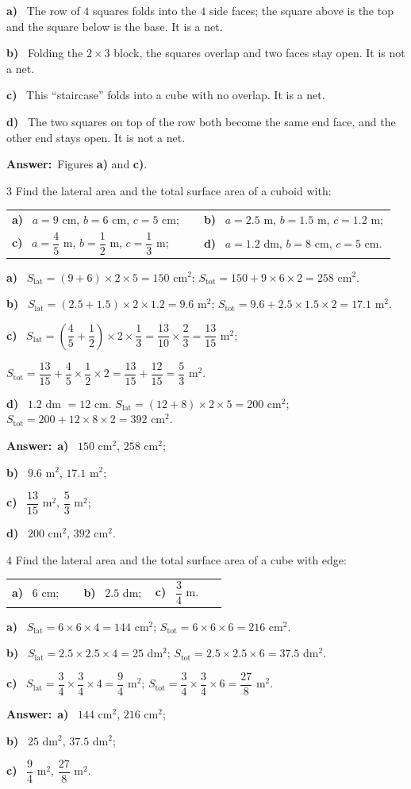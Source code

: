 \documentclass[11pt]{article}
\makeatletter
\newif\ifsol \solfalse
\renewcommand{\arraystretch}{1.35}
\providecommand{\AnsWord}{Đáp số}
\newcommand{\dapso}[1]{\par\textbf{\AnsWord:}\ #1}
\newcommand{\probsol}[1]{%
  \begin{lrbox}{\solmeasure}\begin{minipage}{\dimexpr\linewidth-24pt\relax}#1\end{minipage}\end{lrbox}%
  \ifsol
    \begin{solbox}#1\end{solbox}%
  \else
    \setlength{\solht}{\dimexpr\ht\solmeasure+\dp\solmeasure+0.85cm\relax}%
    \ifdim\solht<1.35cm\setlength{\solht}{1.35cm}\fi
    \begin{tcolorbox}[colback=white,colframe=Line,boxrule=0.8pt,arc=5pt,
      left=8pt,right=8pt,top=4pt,bottom=4pt,height=\solht]{\footnotesize\color{Slate}\itshape\WorkWord}\end{tcolorbox}%
  \fi}
\newcommand{\pa}[1]{\textbf{#1)}\ }
\newenvironment{cols2}{\par\vspace{3pt}\noindent\setlength{\tabcolsep}{0pt}\renewcommand{\arraystretch}{1.3}%
  \begin{tabular}{@{}>{\raggedright\arraybackslash\rule{0pt}{4.4ex}}p{0.48\linewidth}<{\rule[-2.3ex]{0pt}{0pt}}@{\hspace{0.03\linewidth}}>{\raggedright\arraybackslash\rule{0pt}{4.4ex}}p{0.48\linewidth}<{\rule[-2.3ex]{0pt}{0pt}}@{}}}%
  {\end{tabular}\par}
\newenvironment{cols3}{\par\vspace{3pt}\noindent\setlength{\tabcolsep}{0pt}\renewcommand{\arraystretch}{1.3}%
  \begin{tabular}{@{}>{\raggedright\arraybackslash\rule{0pt}{4.4ex}}p{0.32\linewidth}<{\rule[-2.3ex]{0pt}{0pt}}@{\hspace{0.015\linewidth}}>{\raggedright\arraybackslash\rule{0pt}{4.4ex}}p{0.32\linewidth}<{\rule[-2.3ex]{0pt}{0pt}}@{\hspace{0.015\linewidth}}>{\raggedright\arraybackslash\rule{0pt}{4.4ex}}p{0.32\linewidth}<{\rule[-2.3ex]{0pt}{0pt}}@{}}}%
  {\end{tabular}\par}
\newcommand{\gap}{\vspace{0.3cm}}
\def\WorkWord{Your work:}
\def\AnsWord{Answer}
\makeatother
\begin{document}
\probsol{
\pa{a} The row of $4$ squares folds into the $4$ side faces; the square above is the top and the square below is the base. It is a net.\par
\pa{b} Folding the $2\times3$ block, the squares overlap and two faces stay open. It is not a net.\par
\pa{c} This ``staircase'' folds into a cube with no overlap. It is a net.\par
\pa{d} The two squares on top of the row both become the same end face, and the other end stays open. It is not a net.
\dapso{Figures \textbf{a)} and \textbf{c)}.}}
\gap
\begin{probbox}{3}{\relax}
Find the lateral area and the total surface area of a cuboid with:
\begin{cols2}
\pa{a} $a=9$ cm, $b=6$ cm, $c=5$ cm; & \pa{b} $a=2.5$ m, $b=1.5$ m, $c=1.2$ m;\\
\pa{c} $a=\dfrac45$ m, $b=\dfrac12$ m, $c=\dfrac13$ m; & \pa{d} $a=1.2$ dm, $b=8$ cm, $c=5$ cm.
\end{cols2}
\end{probbox}
\probsol{
\pa{a} $S_{\text{lat}}=(9+6)\times2\times5=150$ cm$^2$; $S_{\text{tot}}=150+9\times6\times2=258$ cm$^2$.\par
\pa{b} $S_{\text{lat}}=(2.5+1.5)\times2\times1.2=9.6$ m$^2$; $S_{\text{tot}}=9.6+2.5\times1.5\times2=17.1$ m$^2$.\par
\pa{c} $S_{\text{lat}}=\left(\dfrac45+\dfrac12\right)\times2\times\dfrac13=\dfrac{13}{10}\times\dfrac23=\dfrac{13}{15}$ m$^2$;\par
$S_{\text{tot}}=\dfrac{13}{15}+\dfrac45\times\dfrac12\times2=\dfrac{13}{15}+\dfrac{12}{15}=\dfrac53$ m$^2$.\par
\pa{d} $1.2$ dm $=12$ cm. $S_{\text{lat}}=(12+8)\times2\times5=200$ cm$^2$; $S_{\text{tot}}=200+12\times8\times2=392$ cm$^2$.
\dapso{\pa{a} $150$ cm$^2$, $258$ cm$^2$;\par \pa{b} $9.6$ m$^2$, $17.1$ m$^2$;\par \pa{c} $\dfrac{13}{15}$ m$^2$, $\dfrac53$ m$^2$;\par \pa{d} $200$ cm$^2$, $392$ cm$^2$.}}
\gap
\begin{probbox}{4}{\relax}
Find the lateral area and the total surface area of a cube with edge:
\begin{cols3}
\pa{a} $6$ cm; & \pa{b} $2.5$ dm; & \pa{c} $\dfrac34$ m.
\end{cols3}
\end{probbox}
\probsol{
\pa{a} $S_{\text{lat}}=6\times6\times4=144$ cm$^2$; $S_{\text{tot}}=6\times6\times6=216$ cm$^2$.\par
\pa{b} $S_{\text{lat}}=2.5\times2.5\times4=25$ dm$^2$; $S_{\text{tot}}=2.5\times2.5\times6=37.5$ dm$^2$.\par
\pa{c} $S_{\text{lat}}=\dfrac34\times\dfrac34\times4=\dfrac94$ m$^2$; $S_{\text{tot}}=\dfrac34\times\dfrac34\times6=\dfrac{27}8$ m$^2$.
\dapso{\pa{a} $144$ cm$^2$, $216$ cm$^2$;\par \pa{b} $25$ dm$^2$, $37.5$ dm$^2$;\par \pa{c} $\dfrac94$ m$^2$, $\dfrac{27}8$ m$^2$.}}
\end{document}
